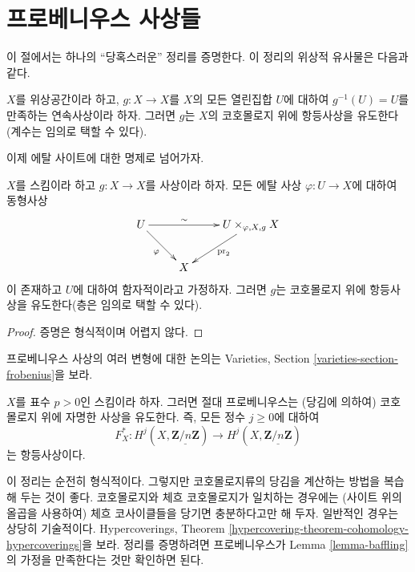 \section{프로베니우스 사상들}
\label{section-frobenii}

\noindent
이 절에서는 하나의 ``당혹스러운'' 정리를 증명한다.
이 정리의 위상적 유사물은 다음과 같다.

\begin{exercise}
\label{exercise-baffling}
$X$를 위상공간이라 하고, $g : X \to X$를 $X$의 모든 열린집합 $U$에
대하여 $g^{-1}(U) = U$를 만족하는 연속사상이라 하자. 그러면 $g$는
$X$의 코호몰로지 위에 항등사상을 유도한다(계수는 임의로 택할 수 있다).
\end{exercise}

\noindent
이제 에탈 사이트에 대한 명제로 넘어가자.

\begin{lemma}
\label{lemma-baffling}
$X$를 스킴이라 하고 $g : X \to X$를 사상이라 하자. 모든 에탈 사상
$\varphi : U \to X$에 대하여 동형사상
$$
\xymatrix{
U \ar[rd]_\varphi \ar[rr]^-\sim & & {U
\times_{\varphi, X, g} X} \ar[ld]^{\text{pr}_2} \\
& X
}
$$
이 존재하고 $U$에 대하여 함자적이라고 가정하자. 그러면 $g$는
코호몰로지 위에 항등사상을 유도한다(층은 임의로 택할 수 있다).
\end{lemma}

\begin{proof}
증명은 형식적이며 어렵지 않다.
\end{proof}

\noindent
프로베니우스 사상의 여러 변형에 대한 논의는 Varieties, Section
\ref{varieties-section-frobenius}을 보라.

\begin{theorem}[당혹스러운 정리]
\label{theorem-baffling}
$X$를 표수 $p > 0$인 스킴이라 하자. 그러면 절대 프로베니우스는
(당김에 의하여) 코호몰로지 위에 자명한 사상을 유도한다. 즉, 모든 정수
$j\geq 0$에 대하여
$$
F_X^* : H^j (X, \underline{\mathbf{Z}/n\mathbf{Z}}) \longrightarrow H^j (X,
\underline{\mathbf{Z}/n\mathbf{Z}})
$$
는 항등사상이다.
\end{theorem}

\noindent
이 정리는 순전히 형식적이다. 그렇지만 코호몰로지류의 당김을 계산하는
방법을 복습해 두는 것이 좋다. 코호몰로지와 체흐 코호몰로지가 일치하는
경우에는 (사이트 위의 올곱을 사용하여) 체흐 코사이클들을 당기면
충분하다고만 해 두자. 일반적인 경우는 상당히 기술적이다.
Hypercoverings, Theorem \ref{hypercovering-theorem-cohomology-hypercoverings}을
보라. 정리를 증명하려면 프로베니우스가 Lemma \ref{lemma-baffling}의
가정을 만족한다는 것만 확인하면 된다.

